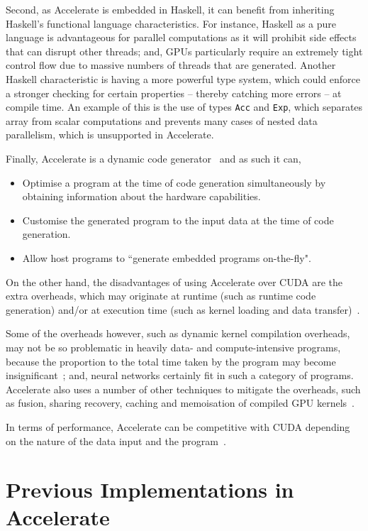 Second, as Accelerate is embedded in Haskell, it can benefit from inheriting Haskell's functional language characteristics. For instance, Haskell as a pure language is advantageous for parallel computations as it will prohibit side effects that can disrupt other threads; and, GPUs particularly require an extremely tight control flow due to massive numbers of threads that are generated. Another Haskell characteristic is having a more powerful type system, which could enforce a stronger checking for certain properties -- thereby catching more errors -- at compile time. An example of this is the use of types \texttt{Acc} and \texttt{Exp}, which separates array from scalar computations and prevents many cases of nested data parallelism, which is unsupported in Accelerate.

Finally, Accelerate is a dynamic code generator~\cite{ChaKelLee11} and as such it can,
\begin{itemize}
\item Optimise a program at the time of code generation simultaneously by obtaining information about the hardware capabilities.
\item Customise the generated program to the input data at the time of code generation.
\item Allow host programs to ``generate embedded programs on-the-fly".
\end{itemize}

On the other hand, the disadvantages of using Accelerate over CUDA are the extra overheads, which may originate at runtime (such as runtime code generation) and/or at execution time (such as kernel loading and data transfer)~\cite{ChaKelLee11}. 

Some of the overheads however, such as dynamic kernel compilation overheads, may not be so problematic in heavily data- and compute-intensive programs, because the proportion to the total time taken by the program may become insignificant~\cite{ChaKelLee11}; and, neural networks certainly fit in such a category of programs. Accelerate also uses a number of other techniques to mitigate the overheads, such as fusion, sharing recovery, caching and memoisation of compiled GPU kernels~\cite{ChaKelLee11}.

In terms of performance, Accelerate can be competitive with CUDA depending on the nature of the data input and the program~\cite{McDChaKel13}. 

\section{Previous Implementations in Accelerate} \label{se:previmplem}

